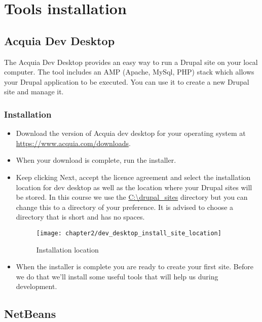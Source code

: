 \chapter{Tools installation}

\section{Acquia Dev Desktop}

The Acquia Dev Desktop provides an easy way to run a Drupal site on your local computer. The tool includes an AMP (Apache, MySql, PHP) stack which allows your Drupal application to be executed. You can use it to create a new Drupal site and manage it.

\subsection{Installation}

\begin{itemize}
	\item Download the version of Acquia dev desktop for your operating system at \url{https://www.acquia.com/downloads}.
	\item When your download is complete, run the installer.
	\item Keep clicking Next, accept the licence agreement and select the installation location for dev desktop as well as the location where your Drupal sites will be stored. In this course we use the \url{C:\drupal_sites} directory but you can change this to a directory of your preference. It is advised to choose a directory that is short and has no spaces.
	
	\begin{figure}[H]
		\centering
		\texttt{[image: chapter2/dev\_desktop\_install\_site\_location]}
		\caption{Installation location}
		\label{fig:dev_desktop_install_site_location}
	\end{figure}
	
	\item When the installer is complete you are ready to create your first site. Before we do that we'll install some useful tools that will help us during development.
	
	
\end{itemize}

\section{NetBeans}

